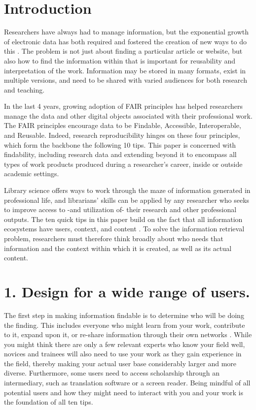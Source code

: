 \documentclass[10pt,letterpaper]{article}
\newcommand{\rulemajor}[1]{\section*{#1}}
\begin{document}
\section*{Introduction}

Researchers have always had to manage information, but the exponential growth of
electronic data has both required and fostered the creation of new ways to do
this \cite{Rosenfeld2015,Hedden2016}. The problem is not just about finding a
particular article or website, but also how to find the information within that is 
important for reusability and interpretation of the work. Information may be stored
in many formats, exist in multiple versions, and need to be shared with varied audiences
for both research and teaching.

In the last 4 years, growing adoption of FAIR principles \cite{Wilkinson2016}
has helped researchers manage the data and other digital objects associated with
their professional work. The FAIR principles encourage data to be Findable,
Accessible, Interoperable, and Reusable. Indeed, research reproducibility
hinges on these four principles, which form the backbone the following 10 tips.
This paper is concerned with findability, including research data and
extending beyond it to encompass all types of work products produced during a
researcher's career, inside or outside academic settings.

Library science offers ways to work through the maze of information generated in
professional life, and librarians' skills can be applied by any researcher who
seeks to improve access to -and utilization of- their research and other 
professional outputs. The ten quick tips in this paper build on the fact that all
information ecosystems have users, context, and content \cite{Rosenfeld2015}.
To solve the information retrieval problem, researchers must therefore think
broadly about who needs that information and the context within which it is
created, as well as its actual content.

\rulemajor{1. Design for a wide range of users.}

The first step in making information findable is to determine who will be doing
the finding. This includes everyone who might learn from your work, contribute
to it, expand upon it, or re-share information through their own networks
\cite{Covert2014}. While you might think there are only a few relevant experts
who know your field well, novices and trainees will also need to use your work
as they gain experience in the field, thereby making your actual user base
considerably larger and more diverse. Furthermore, some users need to access
scholarship through an intermediary, such as translation software or a screen
reader. Being mindful of all potential users and how they might need to
interact with you and your work is the foundation of all ten tips.
\end{document}
